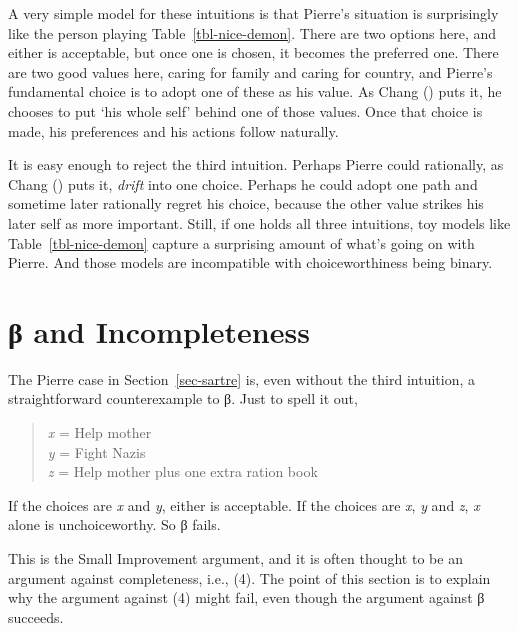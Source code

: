 \documentclass[
  11pt,
  letterpaper,
  DIV=11,
  numbers=noendperiod,
  twoside]{scrartcl}
\begin{document}
A very simple model for these intuitions is that Pierre's situation is
surprisingly like the person playing Table~\ref{tbl-nice-demon}. There
are two options here, and either is acceptable, but once one is chosen,
it becomes the preferred one. There are two good values here, caring for
family and caring for country, and Pierre's fundamental choice is to
adopt one of these as his value. As Chang
() puts it, he chooses to put `his whole
self' behind one of those values. Once that choice is made, his
preferences and his actions follow naturally.

It is easy enough to reject the third intuition. Perhaps Pierre could
rationally, as Chang () puts it,
\emph{drift} into one choice. Perhaps he could adopt one path and
sometime later rationally regret his choice, because the other value
strikes his later self as more important. Still, if one holds all three
intuitions, toy models like Table~\ref{tbl-nice-demon} capture a
surprising amount of what's going on with Pierre. And those models are
incompatible with choiceworthiness being binary.

\section{β and Incompleteness}\label{sec-dorr}

The Pierre case in Section~\ref{sec-sartre} is, even without the third
intuition, a straightforward counterexample to β. Just to spell it out,

\begin{quote}
\emph{x} = Help mother\\
\emph{y} = Fight Nazis\\
\emph{z} = Help mother plus one extra ration book
\end{quote}

If the choices are \emph{x} and \emph{y}, either is acceptable. If the
choices are \emph{x}, \emph{y} and \emph{z}, \emph{x} alone is
unchoiceworthy. So β fails.

This is the Small Improvement argument, and it is often thought to be an
argument against completeness, i.e., (4). The point of this section is
to explain why the argument against (4) might fail, even though the
argument against β succeeds.
\end{document}
